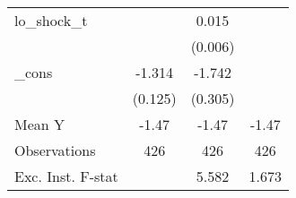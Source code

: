 {\begin{tabular}{l*{3}{c}}
\addlinespace
lo\_shock\_t  &                     &       0.015\sym{**} &                     \\
            &                     &     (0.006)         &                     \\
\addlinespace
\_cons      &      -1.314\sym{***}&      -1.742\sym{***}&                     \\
            &     (0.125)         &     (0.305)         &                     \\
\midrule
Mean Y      &       -1.47         &       -1.47         &       -1.47         \\
Observations&         426         &         426         &         426         \\
Exc. Inst. F-stat&                     &       5.582         &       1.673         \\
\bottomrule
\end{tabular}
}

